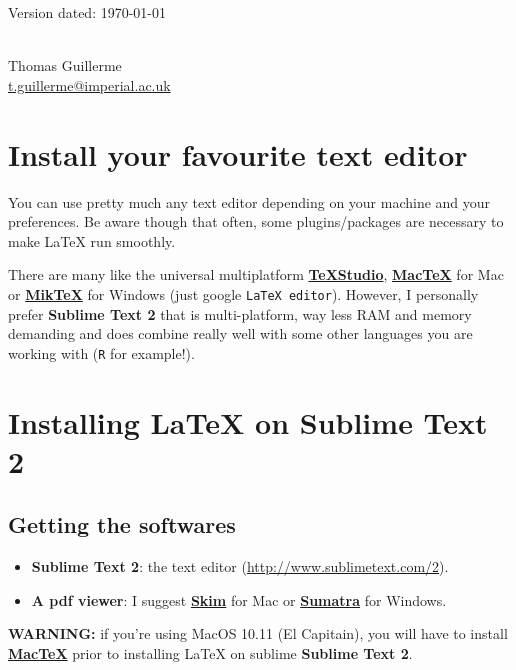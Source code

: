\documentclass[a4paper,11pt]{article}
\begin{document}
\begin{flushright}
Version dated: \today
\end{flushright}
\begin{center}

\\
\bigskip
Thomas Guillerme\\\href{mailto:t.guillerme@imperial.ac.uk}{t.guillerme@imperial.ac.uk}

\end{center}

\section{Install your favourite text editor}
You can use pretty much any text editor depending on your machine and your preferences.
Be aware though that often, some plugins/packages are necessary to make LaTeX run smoothly.

There are many like the universal multiplatform \href{http://texstudio.sourceforge.net/}{\textbf{TeXStudio}}, \href{http://www.tug.org/mactex/index.html}{\textbf{MacTeX}} for Mac or \href{http://miktex.org/}{\textbf{MikTeX}} for Windows (just google \texttt{LaTeX editor}).
However, I personally prefer \textbf{Sublime Text 2} that is multi-platform, way less RAM and memory demanding and does combine really well with some other languages you are working with (\texttt{R} for example!).

\section{Installing LaTeX on Sublime Text 2}
\subsection{Getting the softwares}
\begin{itemize}
\item \textbf{Sublime Text 2}: the text editor (\url{http://www.sublimetext.com/2}).
\item \textbf{A pdf viewer}: I suggest \href{http://skim-app.sourceforge.net/}{\textbf{Skim}} for Mac or \href{http://www.sumatrapdfreader.org/download-free-pdf-viewer.html}{\textbf{Sumatra}} for Windows.
\end{itemize}

\textbf{WARNING:} if you're using MacOS 10.11 (El Capitain), you will have to install \href{http://www.tug.org/mactex/index.html}{\textbf{MacTeX}} prior to installing LaTeX on sublime \textbf{Sublime Text 2}.
\end{document}
